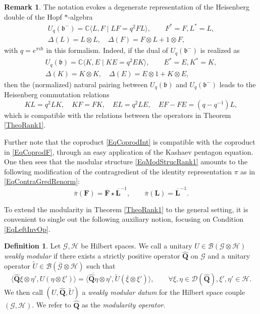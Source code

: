 \documentclass[11pt, reqno]{amsart}
\theoremstyle{definition}
\newtheorem{defn}[theorem]{Definition}
\newtheorem{remark}[theorem]{Remark}
\numberwithin{equation}{section}
\def\C{\mathbb C}
\def\msD{\mathscr D}
\def\Gc{\mathcal G}
\def\Hc{\mathcal H}
\newcommand{\Bc}{\mathcal{B}}
\newcommand{\Qb}{\mathbf{Q}}
\newcommand{\Lb}{\mathbf{L}}
\newcommand{\mfb}{\mathfrak{b}}
\newcommand{\wU}{\widetilde{U}}
\def\stgF{\mathbf{F}}
\begin{document}
\begin{remark}
The notation evokes a degenerate representation of the Heisenberg double of the Hopf $*$-algebra 
\begin{multline}\label{EqCoprodF}
U_q(\mfb^-) = \C\langle L,F\mid LF = q^2FL\rangle,\qquad F^* = F,L^* = L,\\ \Delta(L) = L\otimes L,\quad \Delta(F) = F\otimes L + 1 \otimes F,
\end{multline}
with $q = e^{\pi i \hbar}$ in this formalism. Indeed, if the dual of $U_q(\mfb^-)$ is realized as 
\begin{multline}
U_q(\mfb) = \C\langle K,E\mid KE = q^2EK\rangle,\qquad E^* = E,K^* = K,\\ \Delta(K) = K\otimes K,\quad \Delta(E) = E\otimes 1 + K \otimes E,
\end{multline}
then the (normalized) natural pairing between $U_q(\mfb)$ and $U_q(\mfb^-)$ leads to the Heisenberg commutation relations
\[
KL = q^2 LK,\quad KF = FK,\quad EL = q^2 LE,\quad EF - FE = (q-q^{-1})L,
\]
which is compatible with the relations between the operators in Theorem \ref{TheoRank1}.

Further note that the coproduct \eqref{EqCoprodInt} is compatible with the coproduct in \eqref{EqCoprodF}, through an easy application of the Kashaev pentagon equation. One then sees that the modular structure \eqref{EqModStrucRank1} amounts to the following modification of the contragredient of the identity representation $\pi$ as in \eqref{EqContraGredRenorm}:
\[
\overline{\pi}(\stgF) = \overline{\stgF}\star\overline{\Lb}^{-1},\qquad \overline{\pi}(\Lb) = \overline{\Lb}^{-1}. 
\]
\end{remark}

To extend the modularity in Theorem \ref{TheoRank1} to the general setting, it is convenient to single out the following auxiliary notion, focusing on Condition \eqref{EqLeftInvOp}.

\begin{defn}\label{DefWeaklyMod}
Let $\Gc,\Hc$ be Hilbert spaces. We call a unitary $U\in \Bc(\Gc \otimes\Hc)$ \emph{weakly modular} if there exists a strictly positive operator $\hat{\Qb}$ on $\Gc$ and a unitary operator $\wU \in \Bc(\overline{\Gc}\otimes \Hc)$ such that 
\begin{equation}\label{EqLeftInvOpGen}
\langle \hat{\Qb}\xi\otimes \eta',U(\eta\otimes \xi')\rangle = \langle \overline{\hat{\Qb}\eta}\otimes \eta',\wU(\overline{\xi} \otimes \xi')\rangle,\qquad \forall \xi,\eta\in \msD(\hat{\Qb}),\xi',\eta'\in \Hc.
\end{equation}
We then call $(U,\hat{\Qb},\wU)$ a \emph{weakly modular datum} for the Hilbert space couple $(\Gc,\Hc)$. We refer to $\hat{\Qb}$ as the \emph{modularity operator}.
\end{defn}
\end{document}
